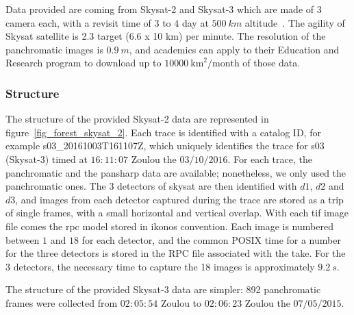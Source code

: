 \documentclass[paper=a4, fontsize=11pt, onecolumn, tikz, dvipsnames, svgnames, x11names]{article}
\begin{document}
Data provided are coming from Skysat-2 and Skysat-3 which are made of 3 camera each, with a revisit time of $3$ to $4$ day at $500~km$ altitude~\cite{planet_product}. The agility of Skysat satellite is 2.3 target (6.6 x 10 km) per minute. The resolution of the panchromatic images is $0.9~m$, and academics can apply to their Education and Research program to download up to $10000~\text{km}^2/\text{month}$ of those data.

\subsubsection{Structure}

The structure of the provided Skysat-2 data are represented in figure~\ref{fig_forest_skysat_2}. Each trace is identified with a catalog ID, for example s03\_20161003T161107Z, which uniquely identifies the trace for s03 (Skysat-3) timed at $16:11:07$ Zoulou the $03/10/2016$. For each trace, the panchromatic and the pansharp data are available; nonetheless, we only used the panchromatic ones. The 3 detectors of skysat are then identified with $d1$, $d2$ and $d3$, and images from each detector captured during the trace are stored as a trip of single frames, with a small horizontal and vertical overlap. With each tif image file comes the rpc model stored in ikonos convention. Each image is numbered between $1$ and $18$ for each detector, and the common POSIX time for a number for the three detectors is stored in the RPC file associated with the take. For the 3 detectors, the necessary time to capture the 18 images is approximately $9.2~s$.

The structure of the provided Skysat-3 data are simpler: 892 panchromatic frames were collected from $02:05:54$ Zoulou to $02:06:23$ Zoulou the $07/05/2015$.
\end{document}
